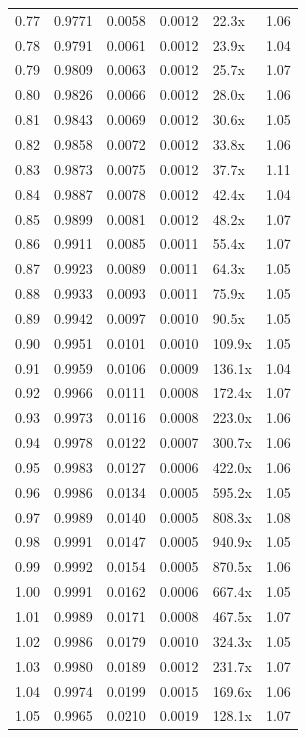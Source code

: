 \begin{tabular}{rrrrlr}
0.77 & 0.9771 & 0.0058 & 0.0012 & 22.3x & 1.06 \\
0.78 & 0.9791 & 0.0061 & 0.0012 & 23.9x & 1.04 \\
0.79 & 0.9809 & 0.0063 & 0.0012 & 25.7x & 1.07 \\
0.80 & 0.9826 & 0.0066 & 0.0012 & 28.0x & 1.06 \\
0.81 & 0.9843 & 0.0069 & 0.0012 & 30.6x & 1.05 \\
0.82 & 0.9858 & 0.0072 & 0.0012 & 33.8x & 1.06 \\
0.83 & 0.9873 & 0.0075 & 0.0012 & 37.7x & 1.11 \\
0.84 & 0.9887 & 0.0078 & 0.0012 & 42.4x & 1.04 \\
0.85 & 0.9899 & 0.0081 & 0.0012 & 48.2x & 1.07 \\
0.86 & 0.9911 & 0.0085 & 0.0011 & 55.4x & 1.07 \\
0.87 & 0.9923 & 0.0089 & 0.0011 & 64.3x & 1.05 \\
0.88 & 0.9933 & 0.0093 & 0.0011 & 75.9x & 1.05 \\
0.89 & 0.9942 & 0.0097 & 0.0010 & 90.5x & 1.05 \\
0.90 & 0.9951 & 0.0101 & 0.0010 & 109.9x & 1.05 \\
0.91 & 0.9959 & 0.0106 & 0.0009 & 136.1x & 1.04 \\
0.92 & 0.9966 & 0.0111 & 0.0008 & 172.4x & 1.07 \\
0.93 & 0.9973 & 0.0116 & 0.0008 & 223.0x & 1.06 \\
0.94 & 0.9978 & 0.0122 & 0.0007 & 300.7x & 1.06 \\
0.95 & 0.9983 & 0.0127 & 0.0006 & 422.0x & 1.06 \\
0.96 & 0.9986 & 0.0134 & 0.0005 & 595.2x & 1.05 \\
0.97 & 0.9989 & 0.0140 & 0.0005 & 808.3x & 1.08 \\
0.98 & 0.9991 & 0.0147 & 0.0005 & 940.9x & 1.05 \\
0.99 & 0.9992 & 0.0154 & 0.0005 & 870.5x & 1.06 \\
1.00 & 0.9991 & 0.0162 & 0.0006 & 667.4x & 1.05 \\
1.01 & 0.9989 & 0.0171 & 0.0008 & 467.5x & 1.07 \\
1.02 & 0.9986 & 0.0179 & 0.0010 & 324.3x & 1.05 \\
1.03 & 0.9980 & 0.0189 & 0.0012 & 231.7x & 1.07 \\
1.04 & 0.9974 & 0.0199 & 0.0015 & 169.6x & 1.06 \\
1.05 & 0.9965 & 0.0210 & 0.0019 & 128.1x & 1.07 \\

\end{tabular}
